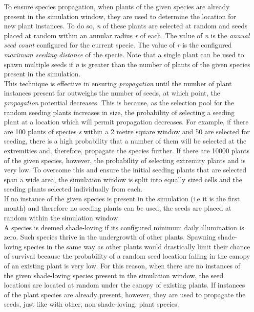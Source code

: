To ensure species propagation, when plants of the given species are already present in the simulation window, they are used to determine the location for new plant instances. To do so, \textit{n} of these plants are selected at random and seeds placed at random within an annular radius \textit{r} of each. The value of \textit{n} is the \textit{annual seed count} configured for the current specie. The value of \textit{r} is the configured \textit{maximum seeding distance} of the specie. Note that a single plant can be used to spawn multiple seeds if \textit{n} is greater than the number of plants of the given species present in the simulation.\\
This technique is effective in ensuring \textit{propagation} until the number of plant instances present far outweighs the number of seeds, at which point, the \textit{propagation} potential decreases. This is because, as the selection pool for the random seeding plants increases in size, the probability of selecting a seeding plant at a location which will permit propagation decreases. For example, if there are 100 plants of species \textit{s} within a 2 metre square window and 50 are selected for seeding, there is a high probability that a number of them will be selected at the extremities and, therefore, propagate the species further. If there are 10000 plants of the given species, however, the probability of selecting extremity plants and is very low. To overcome this and ensure the initial seeding plants that are selected span a wide area, the simulation window is split into equally sized cells and the seeding plants selected individually from each. \\

If no instance of the given species is present in the simulation (i.e it is the first month) and therefore no seeding plants can be used, the seeds are placed at random within the simulation window.\\ 

A species is deemed shade-loving if its configured minimum daily illumination is zero. Such species thrive in the undergrowth of other plants. Spawning shade-loving species in the same way as other plants would drastically limit their chance of survival because the probability of a random seed location falling in the canopy of an existing plant is very low. For this reason, when there are no instances of the given shade-loving species present in the simulation window, the seed locations are located at random under the canopy of existing plants. If instances of the plant species are already present, however, they are used to propagate the seeds, just like with other, non shade-loving, plant species.


